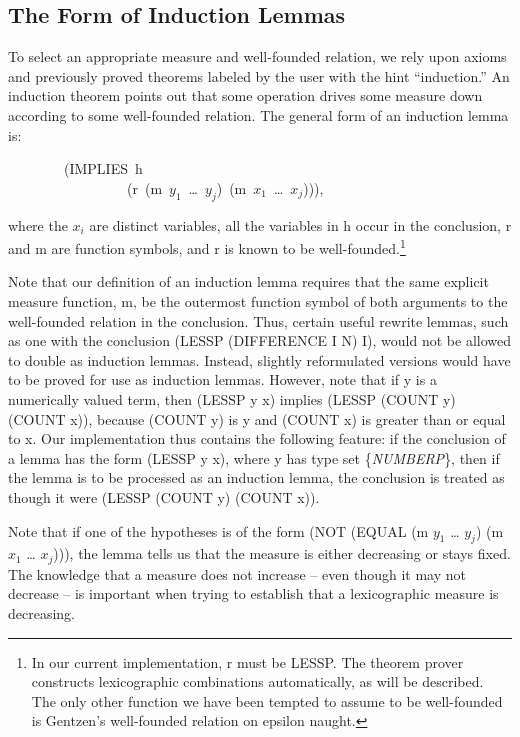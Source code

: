 \documentclass[10pt]{book}
\newenvironment{pubasis}{\begin{flushleft}}{\end{flushleft}}
\begin{document}
\subsection{The Form of Induction Lemmas}
To select an appropriate measure and well-founded relation, we rely
upon axioms and previously proved theorems labeled by the user with the
hint ``induction.''
An induction theorem
points out that some operation drives some measure down according to
some well-founded relation.  The general form of an
induction lemma is:
\begin{pubasis}
~~~~~~~~(IMPLIES~h\\
~~~~~~~~~~~~~~~~~(r~(m~$y_{1}$~\ldots{}~$y_{j}$)~(m~$x_{1}$~\ldots{}~$x_{j}$))),\\
\end{pubasis}
where the $x_{i}$ are distinct variables, all the variables in
h occur in the conclusion, r and m are function symbols, and r is known to be
well-founded.\footnote{In our current implementation, r must be LESSP.  The theorem prover constructs lexicographic combinations automatically, as will be described.  The only other function we have been tempted to assume to be well-founded is Gentzen's \cite{GENTZEN} well-founded relation on epsilon naught.}

Note that our
definition of an induction lemma requires that
the same explicit measure function, m, be the outermost function
symbol of both arguments to the well-founded relation in the conclusion.
Thus, certain useful
rewrite lemmas, such as one with the conclusion
(LESSP (DIFFERENCE I N) I),
would not be allowed to double as induction lemmas.  Instead, slightly
reformulated versions would have to be proved for use as induction lemmas.
However, note that if y is a numerically valued term,
then (LESSP y x) implies
(LESSP (COUNT y) (COUNT x)), because (COUNT y) is y and (COUNT x) is
greater than or equal to x.  Our implementation thus contains the following
feature:  if the conclusion of a lemma
has the form (LESSP y x), where y
has type set \{\emph{NUMBERP}\}, then if the lemma is to be processed as an induction
lemma, the conclusion is treated as though it were
(LESSP (COUNT y) (COUNT x)).

Note that if one of the hypotheses is of the form (NOT (EQUAL (m $y_{1}$ \ldots{} $y_{j}$)
(m $x_{1}$ \ldots{} $x_{j}$))), the lemma tells us that the measure is either decreasing
or stays fixed.  The knowledge that a measure
does not increase -- even though it may not decrease --
is important when trying to establish that a lexicographic measure is
decreasing.
\end{document}

